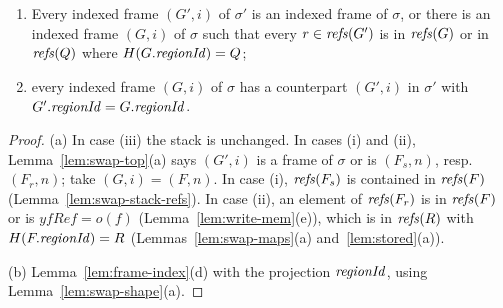 \begin{lemma}
\label{lem:swap-frames}
\begin{enumerate}[nosep,label=(\alph*)]
  \item Every indexed frame $(G', i)$ of $\sigma'$ is an indexed frame of $\sigma$, or there is an
    indexed frame $(G, i)$ of $\sigma$ such that every $r \in \mathit{refs}(G')$ is in $\mathit{refs}(G)$ or in
    $\mathit{refs}(Q)$ where $H(G.\mathit{regionId}) = Q$; 
  \item every indexed frame $(G, i)$ of $\sigma$ has a counterpart $(G', i)$ in $\sigma'$ with
    $G'.\mathit{regionId} = G.\mathit{regionId}$. 
\end{enumerate}
\end{lemma}
\begin{proof}
(a) In case (iii) the stack is unchanged. In cases (i) and (ii), Lemma~\ref{lem:swap-top}(a) says
$(G', i)$ is a frame of $\sigma$ or is $(F_s, n)$, resp.\ $(F_r, n)$; take $(G, i) = (F, n)$. In
case (i), $\mathit{refs}(F_s)$ is contained in $\mathit{refs}(F)$ (Lemma~\ref{lem:swap-stack-refs}). In case (ii), an
element of $\mathit{refs}(F_r)$ is in $\mathit{refs}(F)$ or is $\mathit{yfRef} = o(f)$ (Lemma~\ref{lem:write-mem}(e)),
which is in $\mathit{refs}(R)$ with $H(F.\mathit{regionId}) = R$ (Lemmas~\ref{lem:swap-maps}(a) and~\ref{lem:stored}(a)).

(b) Lemma~\ref{lem:frame-index}(d) with the projection $\mathit{regionId}$, using
Lemma~\ref{lem:swap-shape}(a).
\end{proof}

